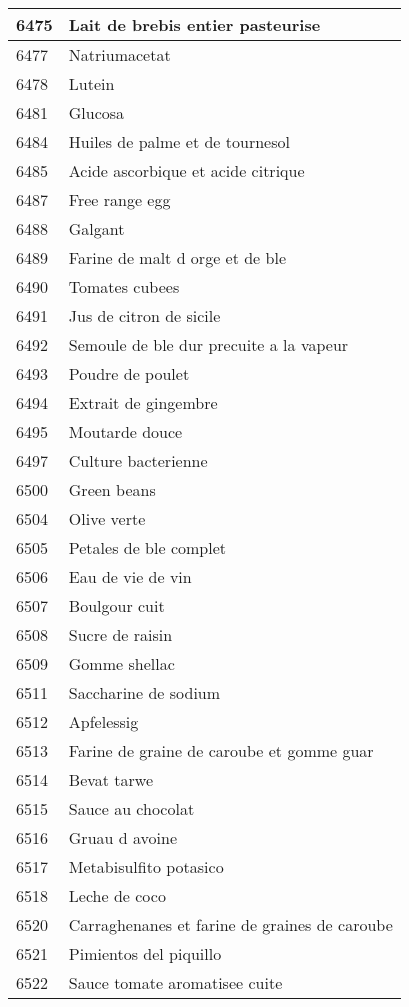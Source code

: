 \begin{longtable}{|l|l|}
6475 & Lait de brebis entier pasteurise \\ \hline 
6477 & Natriumacetat \\ \hline 
6478 & Lutein \\ \hline 
6481 & Glucosa \\ \hline 
6484 & Huiles de palme et de tournesol \\ \hline 
6485 & Acide ascorbique et acide citrique \\ \hline 
6487 & Free range egg \\ \hline 
6488 & Galgant \\ \hline 
6489 & Farine de malt d orge et de ble \\ \hline 
6490 & Tomates cubees \\ \hline 
6491 & Jus de citron de sicile \\ \hline 
6492 & Semoule de ble dur precuite a la vapeur \\ \hline 
6493 & Poudre de poulet \\ \hline 
6494 & Extrait de gingembre \\ \hline 
6495 & Moutarde douce \\ \hline 
6497 & Culture bacterienne \\ \hline 
6500 & Green beans \\ \hline 
6504 & Olive verte \\ \hline 
6505 & Petales de ble complet \\ \hline 
6506 & Eau de vie de vin \\ \hline 
6507 & Boulgour cuit \\ \hline 
6508 & Sucre de raisin \\ \hline 
6509 & Gomme shellac \\ \hline 
6511 & Saccharine de sodium \\ \hline 
6512 & Apfelessig \\ \hline 
6513 & Farine de graine de caroube et gomme guar \\ \hline 
6514 & Bevat tarwe \\ \hline 
6515 & Sauce au chocolat \\ \hline 
6516 & Gruau d avoine \\ \hline 
6517 & Metabisulfito potasico \\ \hline 
6518 & Leche de coco \\ \hline 
6520 & Carraghenanes et farine de graines de caroube \\ \hline 
6521 & Pimientos del piquillo \\ \hline 
6522 & Sauce tomate aromatisee cuite \\ \hline 

\end{longtable}

